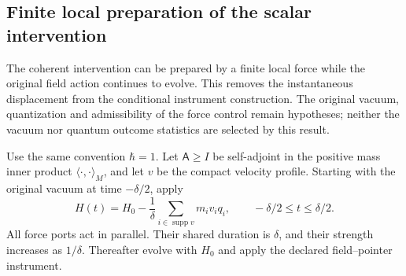 \subsection{Finite local preparation of the scalar intervention}
\label{sec:source-scalar-local-preparation}

The coherent intervention can be prepared by a finite local force while the
original field action continues to evolve. This removes the instantaneous
displacement from the conditional instrument construction. The original
vacuum, quantization and admissibility of the force control remain hypotheses;
neither the vacuum nor quantum outcome statistics are selected by this result.

Use the same convention $\hbar=1$. Let $\mathsf A\ge I$ be self-adjoint in the positive mass inner product
$\langle\cdot,\cdot\rangle_M$, and let $v$ be the compact velocity profile.
Starting with the original vacuum at time $-\delta/2$, apply
\[
 H(t)=H_0-\frac1\delta\sum_{i\in\operatorname{supp}v}m_i v_iq_i,
 \qquad -\delta/2\le t\le\delta/2.
\]
All force ports act in parallel. Their shared duration is $\delta$, and their
strength increases as $1/\delta$. Thereafter evolve with $H_0$ and apply the
declared field--pointer instrument.

